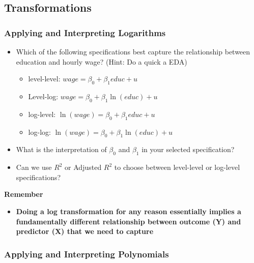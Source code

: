 \documentclass[
]{book}
\providecommand{\tightlist}{%
  \setlength{\itemsep}{0pt}\setlength{\parskip}{0pt}}
\theoremstyle{definition}
\theoremstyle{definition}
\theoremstyle{definition}
\theoremstyle{definition}
\theoremstyle{remark}
\begin{document}
\hypertarget{transformations}{%
\subsection{Transformations}\label{transformations}}

\hypertarget{applying-and-interpreting-logarithms}{%
\subsubsection{Applying and Interpreting Logarithms}\label{applying-and-interpreting-logarithms}}

\begin{itemize}
\item
  Which of the following specifications best capture the relationship between education and hourly wage? (Hint: Do a quick a EDA)

  \begin{itemize}
  \tightlist
  \item
    level-level: \(wage = \beta_0 + \beta_1 educ + u\)
  \item
    Level-log: \(wage = \beta_0 + \beta_1 \ln(educ) + u\)
  \item
    log-level: \(\ln(wage) = \beta_0 + \beta_1 educ + u\)
  \item
    log-log: \(\ln(wage) = \beta_0 + \beta_1 \ln(educ) + u\)
  \end{itemize}
\item
  What is the interpretation of \(\beta_0\) and \(\beta_1\) in your selected specification?
\item
  Can we use \(R^2\) or Adjusted \(R^2\) to choose between level-level or log-level specifications?
\end{itemize}

\textbf{Remember}

\begin{itemize}
\tightlist
\item
  \textbf{Doing a log transformation for any reason essentially implies a fundamentally different relationship between outcome (Y) and predictor (X) that we need to capture}
\end{itemize}

\hypertarget{applying-and-interpreting-polynomials}{%
\subsubsection{Applying and Interpreting Polynomials}\label{applying-and-interpreting-polynomials}}
\end{document}
